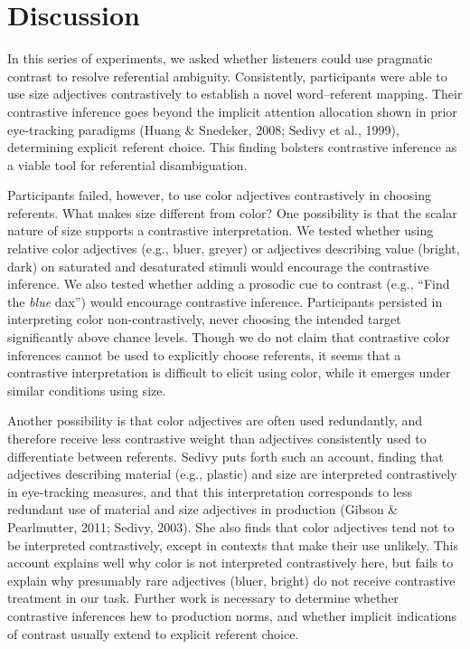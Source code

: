 \documentclass[10pt, letterpaper]{article}
\begin{document}
\section{Discussion}\label{discussion}

In this series of experiments, we asked whether listeners could use
pragmatic contrast to resolve referential ambiguity. Consistently,
participants were able to use size adjectives contrastively to establish
a novel word--referent mapping. Their contrastive inference goes beyond
the implicit attention allocation shown in prior eye-tracking paradigms
(Huang \& Snedeker, 2008; Sedivy et al., 1999), determining explicit
referent choice. This finding bolsters contrastive inference as a viable
tool for referential disambiguation.

Participants failed, however, to use color adjectives contrastively in
choosing referents. What makes size different from color? One
possibility is that the scalar nature of size supports a contrastive
interpretation. We tested whether using relative color adjectives (e.g.,
bluer, greyer) or adjectives describing value (bright, dark) on
saturated and desaturated stimuli would encourage the contrastive
inference. We also tested whether adding a prosodic cue to contrast
(e.g., ``Find the \emph{blue} dax'') would encourage contrastive
inference. Participants persisted in interpreting color
non-contrastively, never choosing the intended target significantly
above chance levels. Though we do not claim that contrastive color
inferences cannot be used to explicitly choose referents, it seems that
a contrastive interpretation is difficult to elicit using color, while
it emerges under similar conditions using size.

Another possibility is that color adjectives are often used redundantly,
and therefore receive less contrastive weight than adjectives
consistently used to differentiate between referents. Sedivy puts forth
such an account, finding that adjectives describing material (e.g.,
plastic) and size are interpreted contrastively in eye-tracking
measures, and that this interpretation corresponds to less redundant use
of material and size adjectives in production (Gibson \& Pearlmutter,
2011; Sedivy, 2003). She also finds that color adjectives tend not to be
interpreted contrastively, except in contexts that make their use
unlikely. This account explains well why color is not interpreted
contrastively here, but fails to explain why presumably rare adjectives
(bluer, bright) do not receive contrastive treatment in our task.
Further work is necessary to determine whether contrastive inferences
hew to production norms, and whether implicit indications of contrast
usually extend to explicit referent choice.
\end{document}
